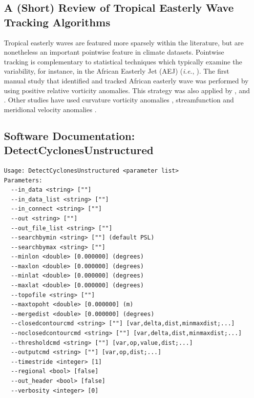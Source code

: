 \documentclass[gmdd, hvmath, online]{copernicus_discussions}
\begin{document}
\subsection{A (Short) Review of Tropical Easterly Wave Tracking Algorithms} \label{sec:TropicalEasterlyWaveAlgorithms}


Tropical easterly waves are featured more sparsely within the literature, but are nonetheless an important pointwise feature in climate datasets.  Pointwise tracking is complementary to statistical techniques which typically examine the variability, for instance, in the African Easterly Jet (AEJ) (\textit{i.e.}, \cite{ceron1999validation}).  The first manual study that identified and tracked African easterly wave was performed by \cite{reed1988evaluation} using positive relative vorticity anomalies.  This strategy was also applied by \cite{thorncroft2001african}, \cite{hodges2003comparison} and \cite{serra2010tracking}.  Other studies have used curvature vorticity anomalies \cite{belanger2014african, bain2014objective}, streamfunction \citep{berry2007african} and meridional velocity anomalies \citep{skinner2014projected}.




\subsection{Software Documentation: DetectCyclonesUnstructured} \label{sec:DetectCyclonesUnstructuredAppendix}

\begin{verbatim}
Usage: DetectCyclonesUnstructured <parameter list>
Parameters:
  --in_data <string> [""] 
  --in_data_list <string> [""]
  --in_connect <string> [""] 
  --out <string> [""] 
  --out_file_list <string> [""]
  --searchbymin <string> [""] (default PSL)
  --searchbymax <string> [""] 
  --minlon <double> [0.000000] (degrees)
  --maxlon <double> [0.000000] (degrees)
  --minlat <double> [0.000000] (degrees)
  --maxlat <double> [0.000000] (degrees)
  --topofile <string> [""] 
  --maxtopoht <double> [0.000000] (m)
  --mergedist <double> [0.000000] (degrees)
  --closedcontourcmd <string> [""] [var,delta,dist,minmaxdist;...]
  --noclosedcontourcmd <string> [""] [var,delta,dist,minmaxdist;...]
  --thresholdcmd <string> [""] [var,op,value,dist;...]
  --outputcmd <string> [""] [var,op,dist;...]
  --timestride <integer> [1] 
  --regional <bool> [false] 
  --out_header <bool> [false] 
  --verbosity <integer> [0] 
\end{verbatim}
\end{document}
